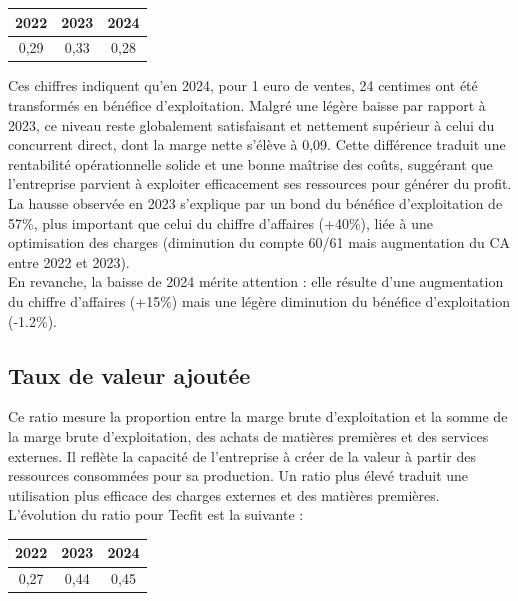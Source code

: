 \begin{table}[h]
\centering
\begin{tabular}{c|c|c}
\textbf{2022} & \textbf{2023} & \textbf{2024} \\
\hline
0,29 & 0,33 & 0,28 \\
\end{tabular}
\end{table}

Ces chiffres indiquent qu’en 2024, pour 1 euro de ventes, 24 centimes ont été transformés en bénéfice d’exploitation. Malgré une légère baisse par rapport à 2023, ce niveau reste globalement satisfaisant et nettement supérieur à celui du concurrent direct, dont la marge nette s’élève à 0,09.
Cette différence traduit une rentabilité opérationnelle solide et une bonne maîtrise des coûts, suggérant que l’entreprise parvient à exploiter efficacement ses ressources pour générer du profit. La hausse observée en 2023 s’explique par un bond du bénéfice d’exploitation de 57\%, plus important que celui du chiffre d’affaires (+40\%), liée à une optimisation des charges (diminution du compte 60/61 mais augmentation du CA entre 2022 et 2023).\\
En revanche, la baisse de 2024 mérite attention : elle résulte d’une augmentation du chiffre d’affaires (+15\%) mais une légère diminution du bénéfice d’exploitation (-1.2\%).


\subsection{Taux de valeur ajoutée}
Ce ratio mesure la proportion entre la marge brute d’exploitation et la somme de la marge brute d’exploitation, des achats de matières premières et des services externes. Il reflète la capacité de l’entreprise à créer de la valeur à partir des ressources consommées pour sa production. Un ratio plus élevé traduit une utilisation plus efficace des charges externes et des matières premières.\\
L’évolution du ratio pour Tecfit est la suivante :

\begin{table}[h]
\centering
\begin{tabular}{c|c|c}
\textbf{2022} & \textbf{2023} & \textbf{2024} \\
\hline
0,27 & 0,44 & 0,45 \\
\end{tabular}
\end{table}

